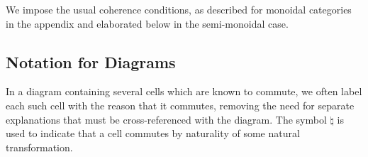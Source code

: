 \documentclass{robincs}
\let\defn = \emph
\let\origint = \int
\def\int{{\textstyle\origint}}
\newif\ifincomplete
\newcommand\sm    {semi-mon\-oid\-al\xspace}
\begin{document}
We impose the usual coherence conditions, as described for monoidal
categories in the appendix and elaborated below in the \sm
case.
\ifincomplete
\subsection{Ends}\label{s-ends}
The notion of \defn{end} is dual to that of coend, and they enjoy
similar properties. (We use ends in \S\ref{s-uniq} below.) A
dinatural transformation from the object $X\in\C$ to the functor
$J:\D\times\D\op\to\D$ is a family of maps $\gamma_A: X\to J(A,A)$
such that for every $f:A\to B$ in $\C$, the diagram
\begin{diagram}
        X & \rTo^{\gamma_A}& J(A,A)\\
        \dTo<{\gamma_B} && \dTo>{J(f,A)}\\
        J(B,B) & \rTo_{J(B,f)}&J(B,A)
\end{diagram}
commutes.

The \defn{end of $J$} is a universal dinatural transformation
$X\To J$; if the end exists, we write this object $X$ as
$\int_{X\in\D} J(X,X)$.

Some important (and easily verified) properties of ends are:
\begin{itemize}
        \item The set of natural transformations $F\To G:\D\to\C$ is
                isomorphic to $\int_X\C(FX,GX)$;
        \item For a functor $F:\C\to\Set$, the Yoneda lemma
                gives a natural isomorphism $FA\cong \int_X\C(A,X)\To FX$,
                and the end on the right exists;
        \item The Fubini theorem for ends: given a functor
          \[J: \D_1\times\D_1\op\times\D_2\times\D_2\op\to\C,\]
                if $\int_{Y\in\D_2}J(X,X',Y,Y)$ exists for
                        all $X$, $X'\in\D_1$ then
        \[
                \int_{X\in\D_1}\int_{Y\in\D_2} J(X,X,Y,Y) \cong
                        \int_{(X,Y)\in\D_1\times\D_2}J(X,X,Y,Y).
        \]
\end{itemize}
\fi %

\subsection{Notation for Diagrams}
In a diagram containing several cells which are known to commute,
we often label each such cell with the reason that it commutes,
removing the need for separate explanations that must be
cross-referenced with the diagram.
The symbol $\natural$ is used to indicate that a cell commutes
by naturality of some natural transformation.
\end{document}
